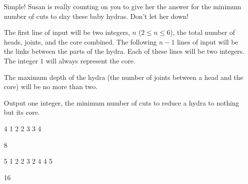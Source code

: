 Simple!
Susan is really counting on you to give her the answer for the minimum number of cuts to slay these baby hydras.
Don't let her down!

\begin{formalin}
The first line of input will be two integers, $n$ ($2 \leq n \leq 6$), the total number of heads, joints, and the core combined.
The following $n-1$ lines of input will be the links between the parts of the hydra.
Each of these lines will be two integers.
The integer $1$ will always represent the core.

The maximum depth of the hydra (the number of joints between a head and the core) will be no more than two.
\end{formalin}

\begin{formalout}
Output one integer, the minimum number of cuts to reduce a hydra to nothing but its core.
\end{formalout}

\begin{datain}
4
1 2
2 3
3 4
\end{datain}
\begin{dataout}
8
\end{dataout}

\begin{datain}
5
1 2
2 3
2 4
4 5
\end{datain}
\begin{dataout}
16
\end{dataout}
